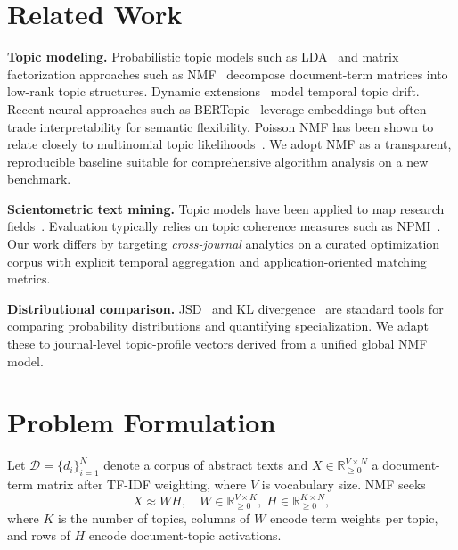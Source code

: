 \documentclass[conference]{IEEEtran}
\begin{document}
\section{Related Work}
\label{sec:related}

\textbf{Topic modeling.}
Probabilistic topic models such as LDA~\cite{blei2003lda} and matrix factorization approaches such as NMF~\cite{lee1999nmf,lee2001nmf} decompose document-term matrices into low-rank topic structures.
Dynamic extensions~\cite{blei2006dynamic} model temporal topic drift.
Recent neural approaches such as BERTopic~\cite{grootendorst2022bertopic} leverage embeddings but often trade interpretability for semantic flexibility.
Poisson NMF has been shown to relate closely to multinomial topic likelihoods~\cite{willis2021poisson}.
We adopt NMF as a transparent, reproducible baseline suitable for comprehensive algorithm analysis on a new benchmark.

\textbf{Scientometric text mining.}
Topic models have been applied to map research fields~\cite{silva2016scientometrics,wang2019scholarly,endres2022topic}.
Evaluation typically relies on topic coherence measures such as NPMI~\cite{newman2010npmi,roder2015coherence}.
Our work differs by targeting \emph{cross-journal} analytics on a curated optimization corpus with explicit temporal aggregation and application-oriented matching metrics.

\textbf{Distributional comparison.}
JSD~\cite{lin1991jsd} and KL divergence~\cite{kullback1951kl} are standard tools for comparing probability distributions and quantifying specialization.
We adapt these to journal-level topic-profile vectors derived from a unified global NMF model.

\section{Problem Formulation}
\label{sec:formulation}

Let $\mathcal{D}=\{d_i\}_{i=1}^{N}$ denote a corpus of abstract texts and $X\in\mathbb{R}^{V\times N}_{\ge 0}$ a document-term matrix after TF-IDF weighting, where $V$ is vocabulary size.
NMF seeks
\begin{equation}
X \approx W H,\quad W\in\mathbb{R}^{V\times K}_{\ge 0},\; H\in\mathbb{R}^{K\times N}_{\ge 0},
\label{eq:nmf}
\end{equation}
where $K$ is the number of topics, columns of $W$ encode term weights per topic, and rows of $H$ encode document-topic activations.
\end{document}
